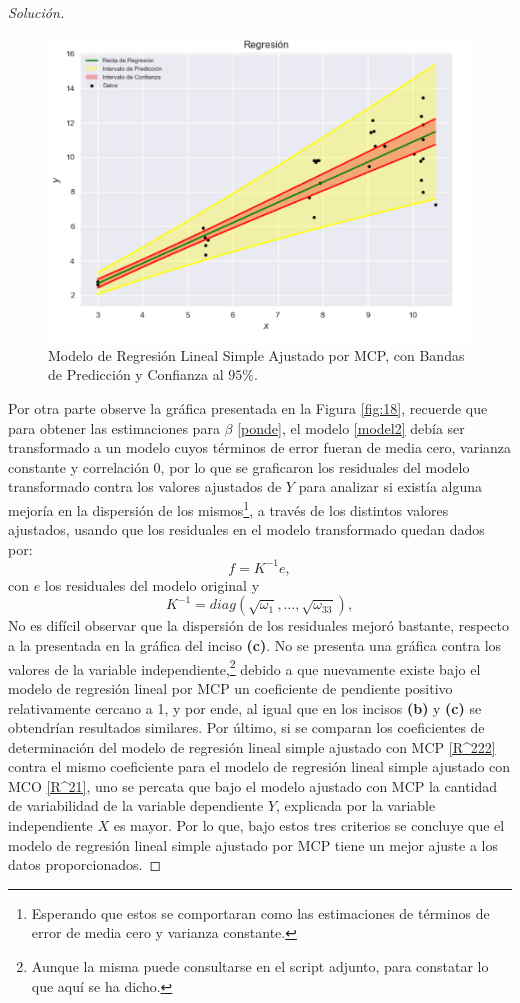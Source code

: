 \documentclass[10.5pt,notitlepage]{article}
\newenvironment{solucion}
  {\begin{proof}[Solución]}
  {\end{proof}}
\theoremstyle{plain}
\begin{document}
\begin{solucion}
\begin{figure}[htb]
 \centering
 \includegraphics[scale=0.40]{Regresión MCP.png}
 \caption{Modelo de Regresión Lineal Simple Ajustado por MCP, con Bandas de Predicción y Confianza al \(95\%\).}
 \label{fig:17}
\end{figure}

Por otra parte observe la gráfica presentada en la Figura \ref{fig:18}, recuerde que para obtener las estimaciones para \(\beta\) \eqref{ponde}, el modelo \eqref{model2} debía ser transformado a un modelo cuyos términos de error fueran de media cero, varianza constante y correlación \(0\), por lo que se graficaron los residuales del modelo transformado contra los valores ajustados de \(Y\) para analizar si existía alguna mejoría en la dispersión de los mismos\footnote{Esperando que estos se comportaran como las estimaciones de términos de error de media cero y varianza constante.}, a través de los distintos valores ajustados, usando que los residuales en el modelo transformado quedan dados por: 
\[
f = K^{-1}e, 
\]
con \(e\) los residuales del modelo original y 
\[
K^{-1} = diag(\sqrt{\omega_1}, \hdots, \sqrt{\omega_{33}}),
\]
No es difícil observar que la dispersión de los residuales mejoró bastante, respecto a la presentada en la gráfica del inciso \textbf{(c)}. No se presenta una gráfica contra los valores de la variable independiente,\footnote{Aunque la misma puede consultarse en el script adjunto, para constatar lo que aquí se ha dicho.} debido a que nuevamente existe bajo el modelo de regresión lineal por MCP un coeficiente de pendiente positivo relativamente cercano a 1, y por ende, al igual que en los incisos \textbf{(b)} y \textbf{(c)} se obtendrían resultados similares. Por último, si se comparan los coeficientes de determinación del modelo de regresión lineal simple ajustado con MCP \eqref{R^222} contra el mismo coeficiente para el modelo de regresión lineal simple ajustado con MCO \eqref{R^21}, uno se percata que bajo el modelo ajustado con MCP la cantidad de variabilidad de la variable dependiente \(Y\), explicada por la variable independiente \(X\) es mayor. Por lo que, bajo estos tres criterios se concluye que el modelo de regresión lineal simple ajustado por MCP tiene un mejor ajuste a los datos proporcionados. 


\end{solucion}
\end{document}
